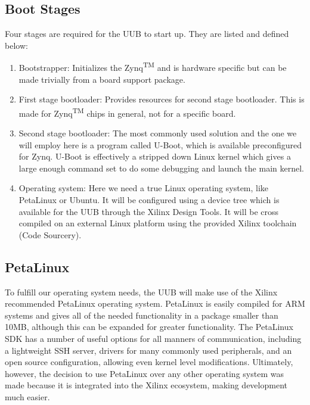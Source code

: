 \subsection{Boot Stages}
Four stages are required for the UUB to start up. They are listed and defined below:
 \begin{enumerate}
 \item Bootstrapper: Initializes the Zynq\textsuperscript{TM} and is hardware specific but can be made trivially from a board support package.
 \item First stage bootloader: Provides resources for second stage bootloader. This is made for Zynq\textsuperscript{TM} chips in general, not for a specific board.
 \item Second stage bootloader: The most commonly used solution and the one we will employ here is a program called U-Boot, which is available preconfigured for Zynq. U-Boot is effectively a stripped down Linux kernel which gives a large enough command set to do some debugging and launch the main kernel.
 \item Operating system: Here we need a true Linux operating system, like PetaLinux or Ubuntu. It will be configured using a device tree which is available for the UUB through the Xilinx Design Tools. It will be cross compiled on an external Linux platform using the provided Xilinx toolchain (Code Sourcery).
\end{enumerate}
\subsection{PetaLinux}
To fulfill our operating system needs, the UUB will make use of the Xilinx recommended PetaLinux operating system. PetaLinux is easily compiled for ARM systems and gives all of the needed functionality in a package smaller than 10MB, although this can be expanded for greater functionality. The PetaLinux SDK has a number of useful options for all manners of communication, including a lightweight SSH server, drivers for many commonly used peripherals, and an open source configuration, allowing even kernel level modifications. Ultimately, however, the decision to use PetaLinux over any other operating system was made because it is integrated into the Xilinx ecosystem, making development much easier.
